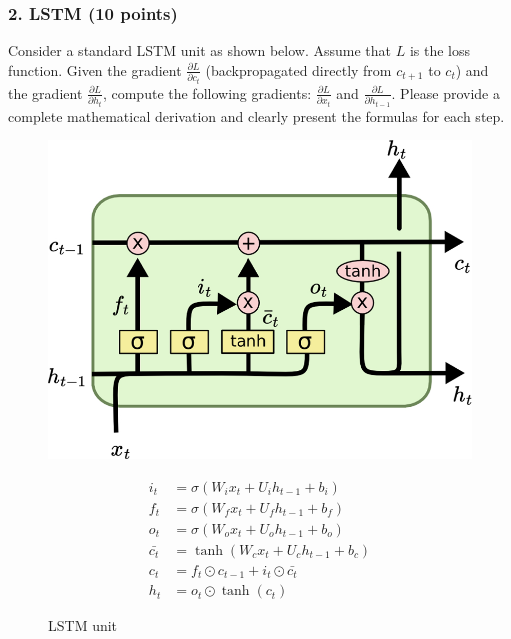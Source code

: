 \documentclass[12pt]{article}%
\begin{document}
\subsubsection*{2. LSTM (10 points)}
	\setlength{\itemsep}{-1pt}
	\setlength{\parsep}{0pt}
	\setlength{\parskip}{0pt}
Consider a standard LSTM unit as shown below. Assume that \( L \) is the loss function.  Given the gradient \( \frac{\partial L}{\partial c_t}\) (backpropagated directly from \( c_{t+1} \)  to \( c_{t}\)) and the gradient \( \frac{\partial L}{\partial h_t}\), compute the following gradients: \( \frac{\partial L}{\partial x_t} \) and \( \frac{\partial L}{\partial h_{t-1}} \). Please provide a complete mathematical derivation and clearly present the formulas for each step.
	\begin{figure}[h]
		\centering
		\begin{minipage}{0.4\textwidth}
			\centering
			\includegraphics[width=\textwidth]{lstm.png} 
			\caption{LSTM unit}
			\label{fig:lstm}
		\end{minipage}
		\hfill
		\begin{minipage}{0.5\textwidth}
			\centering
			\begin{align*}
				i_t &= \sigma(W_i x_t + U_i h_{t-1} + b_i) \\
				f_t &= \sigma(W_f x_t + U_f h_{t-1} + b_f) \\
				o_t &= \sigma(W_o x_t + U_o h_{t-1} + b_o) \\
				\bar{c_t} &= \tanh(W_c x_t + U_c h_{t-1} + b_c) \\
				c_t &= f_t \odot c_{t-1} + i_t \odot \bar{c_t} \\
				h_t &= o_t \odot \tanh(c_t)
			\end{align*}
		\end{minipage}
	\end{figure}\\

\newpage


\end{document}
